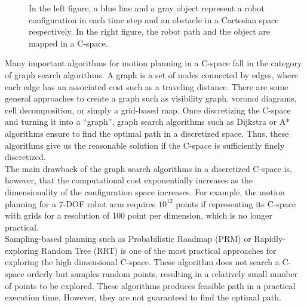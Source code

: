 \documentclass[12pt]{article} %
\begin{document}
\begin{figure}[H] %
\caption{In the left figure, a blue line and a gray object represent a robot configuration in each time step and an obstacle in a Cartesian space respectively. In the right figure, the robot path and the object are mapped in a C-space.}
\label{fig:C-space}
\end{figure}

Many important algorithms for motion planning in a C-space fall in the category of graph search algorithms. A graph is a set of nodes connected by edges, where each edge has an associated cost such as a traveling distance. There are some general approaches to create a graph such as visibility graph\cite{Lozano2}, voronoi diagrams\cite{Aurenhammer}, cell decomposition\cite{LaValle}, or simply a grid-based map. Once discretizing the C-space and turning it into a “graph”,  graph search algorithms such as Dijkstra\cite{Cormen} or A* algorithms\cite{Zeng} ensure to find the optimal path in a discretized space. Thus, these algorithms give us the reasonable solution if the C-space is sufficiently finely discretized. \\

The main drawback of the graph search algorithms in a discretized C-space is, however, that the computational cost exponentially increases as the dimensionality of the configuration space increases. For example, the motion planning for a 7-DOF robot arm requires $10^{12}$ points if representing its C-space with grids for a resolution of 100 point per dimension, which is no longer practical. \\

Sampling-based planning such as Probabilistic Roadmap (PRM)\cite{Kavraki} or Rapidly-exploring Random Tree (RRT)\cite{LaValle2} is one of the most practical approaches for exploring the high dimensional C-space. These algorithm does not search a C-space orderly but samples random points, resulting in a relatively small number of points to be explored. These algorithms produces feasible path in a practical execution time. However, they are not guaranteed to find the optimal path. 
\end{document}
